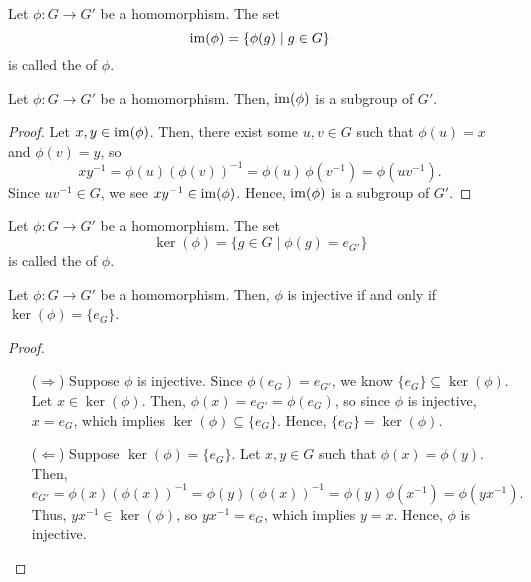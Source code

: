 \begin{defn}
Let $ \phi:G\to G' $ be a homomorphism. The set 
\begin{equation*}
    \operatorname{im}(\phi)=\{\phi(g)\mid g\in G\}
\end{equation*}
is called the  of $ \phi $.
\end{defn}

\begin{prop}
Let $ \phi:G\to G' $ be a homomorphism. Then, $ \operatorname{im}(\phi) $ is a subgroup of $ G' $.
\end{prop}
\begin{proof}
Let $ x,y\in\operatorname{im}(\phi) $. Then, there exist some $ u,v\in G $ such that $ \phi(u)=x $ and $ \phi(v)=y $, so
\begin{equation*}
    xy^{-1}=\phi(u)(\phi(v))^{-1}=\phi(u)\,\phi(v^{-1})=\phi(uv^{-1}).
\end{equation*}
Since $ uv^{-1}\in G $, we see $ xy^{-1}\in\operatorname{im}(\phi) $. Hence, $ \operatorname{im}(\phi) $ is a subgroup of $ G' $.
\end{proof}

\begin{defn}
Let $ \phi:G\to G' $ be a homomorphism. The set
\begin{equation*}
    \ker(\phi)=\{g\in G\mid\phi(g)=e_{G'}\}
\end{equation*}
is called the  of $ \phi $.
\end{defn}

\begin{thm}\label{thm:monomorphism}
Let $ \phi:G\to G' $ be a homomorphism. Then, $ \phi $ is injective if and only if $ \ker(\phi)=\{e_G\} $.
\end{thm}
\begin{proof}~
\begin{enumerate}
    \item[($ \Rightarrow $)] Suppose $ \phi $ is injective. Since $ \phi(e_G)=e_{G'} $, we know $ \{e_G\}\subseteq\ker(\phi) $. Let $ x\in\ker(\phi) $. Then, $ \phi(x)=e_{G'}=\phi(e_G) $, so since $ \phi $ is injective, $ x=e_G $, which implies $ \ker(\phi)\subseteq\{e_G\} $. Hence, $ \{e_G\}=\ker(\phi) $.

    \item[($ \Leftarrow $)] Suppose $ \ker(\phi)=\{e_G\} $. Let $ x,y\in G $ such that $ \phi(x)=\phi(y) $. Then,
    \begin{equation*}
        e_{G'}=\phi(x)(\phi(x))^{-1}=\phi(y)(\phi(x))^{-1}=\phi(y)\,\phi(x^{-1})=\phi(yx^{-1}).
    \end{equation*}
    Thus, $ yx^{-1}\in\ker(\phi) $, so $ yx^{-1}=e_G $, which implies $ y=x $. Hence, $ \phi $ is injective.\qedhere
\end{enumerate}
\end{proof}

